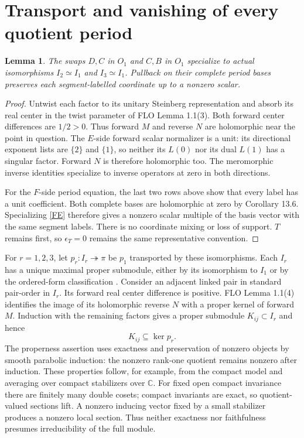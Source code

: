 \documentclass[11pt]{article}
\newtheorem{lemma}[theorem]{Lemma}
\newcommand{\C}{\mathbb C}
\begin{document}
\section{Transport and vanishing of every quotient period}
\begin{lemma}\label{transport}
The swaps $D,C$ in $O_1$ and $C,B$ in $O_1$ specialize to actual isomorphisms $I_2\simeq I_1$ and $I_3\simeq I_1$. Pullback on their complete period bases preserves each segment-labelled coordinate up to a nonzero scalar.
\end{lemma}
\begin{proof}
Untwist each factor to its unitary Steinberg representation and absorb its real center in the twist parameter of FLO Lemma 1.1(3). Both forward center differences are $1/2>0$. Thus forward $M$ and reverse $N$ are holomorphic near the point in question. The $E$-side forward scalar normalizer is a unit: its directional exponent lists are $\{2\}$ and $\{1\}$, so neither its $L(0)$ nor its dual $L(1)$ has a singular factor. Forward $N$ is therefore holomorphic too. The meromorphic inverse identities specialize to inverse operators at zero in both directions.

For the $F$-side period equation, the last two rows above show that every label has a unit coefficient. Both complete bases are holomorphic at zero by Corollary 13.6. Specializing \eqref{FE} therefore gives a nonzero scalar multiple of the basis vector with the same segment labels. There is no coordinate mixing or loss of support. $T$ remains first, so $\epsilon_T=0$ remains the same representative convention.
\end{proof}

For $r=1,2,3$, let $p_r:I_r\twoheadrightarrow\pi$ be $p_1$ transported by these isomorphisms. Each $I_r$ has a unique maximal proper submodule, either by its isomorphism to $I_1$ or by the ordered-form classification \cite[Theorem 2.6]{LM16}. Consider an adjacent linked pair in standard pair-order in $I_r$. Its forward real center difference is positive. FLO Lemma 1.1(4) identifies the image of its holomorphic reverse $N$ with a proper kernel of forward $M$. Induction with the remaining factors gives a proper submodule $K_{ij}\subset I_r$ and hence
\begin{equation}\label{containment}
K_{ij}\subseteq\ker p_r.
\end{equation}
The properness assertion uses exactness and preservation of nonzero objects by smooth parabolic induction: the nonzero rank-one quotient remains nonzero after induction. These properties follow, for example, from the compact model and averaging over compact stabilizers over $\C$. For fixed open compact invariance there are finitely many double cosets; compact invariants are exact, so quotient-valued sections lift. A nonzero inducing vector fixed by a small stabilizer produces a nonzero local section. Thus neither exactness nor faithfulness presumes irreducibility of the full module.
\end{document}
